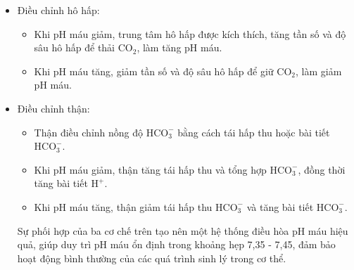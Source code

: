 \begin{bt}
{\begin{enumerate}
\begin{itemize}
\begin{itemize}
					\item Khi có axit được thêm vào máu: $\mathrm{H}^+ + \mathrm{HCO}_3^- \rightarrow \mathrm{H}_2\mathrm{CO}_3 \rightarrow \mathrm{CO}_2 + \mathrm{H}_2\mathrm{O}$
					\item Khi có bazơ được thêm vào máu: $\mathrm{OH}^- + \mathrm{H}_2\mathrm{CO}_3 \rightarrow \mathrm{HCO}_3^- + \mathrm{H}_2\mathrm{O}$
				\end{itemize}
				\item Điều chỉnh hô hấp:
				\begin{itemize}
					\item Khi pH máu giảm, trung tâm hô hấp được kích thích, tăng tần số và độ sâu hô hấp để thải $\mathrm{CO}_2$, làm tăng pH máu.
					\item Khi pH máu tăng, giảm tần số và độ sâu hô hấp để giữ $\mathrm{CO}_2$, làm giảm pH máu.
				\end{itemize}
				
				\item Điều chỉnh thận:
				\begin{itemize}
					\item Thận điều chỉnh nồng độ $\mathrm{HCO}_3^-$ bằng cách tái hấp thu hoặc bài tiết $\mathrm{HCO}_3^-$.
					\item Khi pH máu giảm, thận tăng tái hấp thu và tổng hợp $\mathrm{HCO}_3^-$, đồng thời tăng bài tiết $\mathrm{H}^+$.
					\item Khi pH máu tăng, thận giảm tái hấp thu $\mathrm{HCO}_3^-$ và tăng bài tiết $\mathrm{HCO}_3^-$.
				\end{itemize}
				Sự phối hợp của ba cơ chế trên tạo nên một hệ thống điều hòa pH máu hiệu quả, giúp duy trì pH máu ổn định trong khoảng hẹp 7,35 - 7,45, đảm bảo hoạt động bình thường của các quá trình sinh lý trong cơ thể.
			\end{itemize}
		\end{enumerate}
	}
\end{bt}
